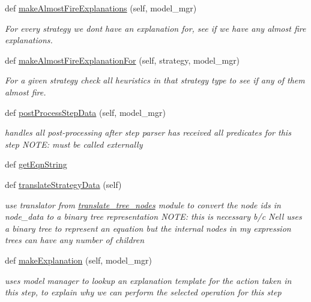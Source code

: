 \begin{DoxyCompactItemize}
def \hyperlink{classtotally__new__visualizer_1_1_equation_step_parser_a0a9f53c1c140fecd4e5d6bd6bda9ae7e}{make\+Almost\+Fire\+Explanations} (self, model\+\_\+mgr)
\begin{DoxyCompactList}\small\item\em For every strategy we don\textquotesingle{}t have an explanation for, see if we have any \textquotesingle{}almost fire\textquotesingle{} explanations. \end{DoxyCompactList}\item 
def \hyperlink{classtotally__new__visualizer_1_1_equation_step_parser_a51372d5ce7c1fec1c4a1a7f7f8bfe3de}{make\+Almost\+Fire\+Explanation\+For} (self, strategy, model\+\_\+mgr)
\begin{DoxyCompactList}\small\item\em For a given strategy check all heuristics in that strategy type to see if any of them almost fire. \end{DoxyCompactList}\item 
def \hyperlink{classtotally__new__visualizer_1_1_equation_step_parser_aef1f6ba0922d50500fcf66e026effede}{post\+Process\+Step\+Data} (self, model\+\_\+mgr)
\begin{DoxyCompactList}\small\item\em handles all post-\/processing after step parser has received all predicates for this step N\+O\+T\+E\+: must be called externally \end{DoxyCompactList}\item 
def \hyperlink{classtotally__new__visualizer_1_1_equation_step_parser_ad4a30f362747a194b4f3e36ca5ddc238}{get\+Eqn\+String}
\item 
def \hyperlink{classtotally__new__visualizer_1_1_equation_step_parser_a25048323c9f80cbb0ea140985dfc1333}{translate\+Strategy\+Data} (self)
\begin{DoxyCompactList}\small\item\em use translator from \hyperlink{namespacetranslate__tree__nodes}{translate\+\_\+tree\+\_\+nodes} module to convert the node id\textquotesingle{}s in node\+\_\+data to a binary tree representation N\+O\+T\+E\+: this is necessary b/c Nell uses a binary tree to represent an equation but the internal nodes in my expression trees can have any number of children \end{DoxyCompactList}\item 
def \hyperlink{classtotally__new__visualizer_1_1_equation_step_parser_a3c973167ae47c603bf5f6ed2e04eea10}{make\+Explanation} (self, model\+\_\+mgr)
\begin{DoxyCompactList}\small\item\em uses model manager to lookup an explanation template for the action taken in this step, to explain why we can perform the selected operation for this step \end{DoxyCompactList}\item 

\end{DoxyCompactItemize}
